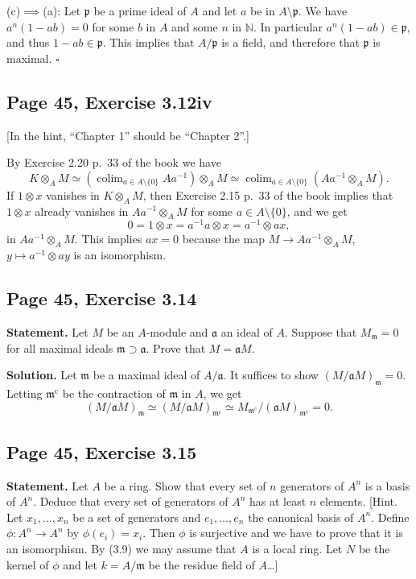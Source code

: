 \documentclass[parskip=half,fontsize=12pt]{scrartcl}%
\newcommand{\oo}{\operatorname}\newcommand{\ooo}{\operatorname*}
\newcommand{\mf}{\mathfrak}
\newcommand{\aaa}{\mf a}
\newcommand{\mmm}{\mf m}
\newcommand{\ppp}{\mf p}
\DeclareMathOperator*{\colim}{colim}
\begin{document}
(c)$\implies$(a): Let $\ppp$ be a prime ideal of $A$ and let $a$ be in $A\setminus\ppp$. We have $a^n(1-ab)=0$ for some $b$ in $A$ and some $n$ in $\mathbb N$. In particular $a^n(1-ab)\in\ppp$, and thus $1-ab\in\ppp$. This implies that $A/\ppp$ is a field, and therefore that $\ppp$ is maximal. $\square$

\subsection{Page 45, Exercise 3.12iv}%

[In the hint, ``Chapter 1'' should be ``Chapter 2''.]

By Exercise 2.20 p.~33 of the book we have 
$$
K\otimes_AM\simeq\left(\colim_{a\in A\setminus\{0\}}Aa^{-1}\right)\otimes_AM\simeq\colim_{a\in A\setminus\{0\}}\left(Aa^{-1}\otimes_AM\right).
$$ 
If $1\otimes x$ vanishes in $K\otimes_AM$, then Exercise 2.15 p.~33 of the book implies that $1\otimes x$ already vanishes in $Aa^{-1}\otimes_AM$ for some $a\in A\setminus\{0\}$, and we get 
$$
0=1\otimes x=a^{-1}a\otimes x=a^{-1}\otimes ax,
$$ 
in $Aa^{-1}\otimes_AM$. This implies $ax=0$ because the map $M\to Aa^{-1}\otimes_AM$, $y\mapsto a^{-1}\otimes ay$ is an isomorphism. %

\subsection{Page 45, Exercise 3.14}%

\textbf{Statement.} Let $M$ be an $A$-module and $\aaa$ an ideal of $A$. Suppose that $M_\mmm=0$ for all maximal ideals $\mmm\supset\aaa$. Prove that $M=\aaa M$. 

\textbf{Solution.} Let $\mmm$ be a maximal ideal of $A/\aaa$. It suffices to show $(M/\aaa M)_\mmm=0$. Letting $\mmm^{\oo c}$ be the contraction of $\mmm$ in $A$, we get 
$$
(M/\aaa M)_\mmm\simeq(M/\aaa M)_{\mmm^{\oo c}}\simeq M_{\mmm^{\oo c}}/(\aaa M)_{\mmm^{\oo c}}=0.
$$ 

\subsection{Page 45, Exercise 3.15}%

\textbf{Statement.} Let $A$ be a ring. %
Show that every set of $n$ generators of $A^n$ is a basis of $A^n$. Deduce that every set of generators of $A^n$ has at least $n$ elements. [Hint. Let $x_1,\ldots,x_n$ be a set of generators and $e_1,\ldots,e_n$ the canonical basis of $A^n$. Define $\phi:A^n\to A^n$ by $\phi(e_i)=x_i$. Then $\phi$ is surjective and we have to prove that it is an isomorphism. By (3.9) we may assume that $A$ is a local ring. Let $N$ be the kernel of $\phi$ and let $k=A/\mmm$ be the residue field of $A$\ldots]
\end{document}

